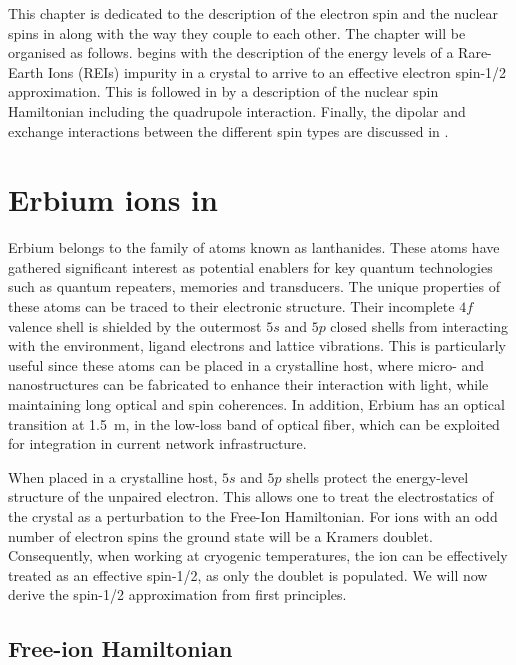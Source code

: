 This chapter is dedicated to the description of the \Er electron spin and the nuclear spins in \Ca along with the way they couple to each other. The chapter will be organised as follows.  begins with the description of the energy levels of a Rare-Earth Ions (REIs) impurity in a crystal to arrive to an effective electron spin-1/2 approximation. This is followed in  by a description of the nuclear spin Hamiltonian including the quadrupole interaction. Finally, the dipolar and exchange interactions between the different spin types are discussed in .

\section{Erbium ions in \Ca}

Erbium belongs to the family of atoms known as lanthanides. These atoms have gathered significant interest as potential enablers for key quantum technologies such as quantum repeaters, memories and transducers. The unique properties of these atoms can be traced to their electronic structure. Their incomplete $4f$ valence shell is shielded by the outermost $5s$ and $5p$ closed shells from interacting with the environment, ligand electrons and lattice vibrations. This is particularly useful since these atoms can be placed in a crystalline host, where micro- and nanostructures can be fabricated to enhance their interaction with light, while maintaining long optical and spin coherences. In addition, Erbium has an optical transition at 1.5~\textmu m, in the low-loss band of optical fiber, which can be exploited for integration in current network infrastructure.

When placed in a crystalline host, $5s$ and $5p$ shells protect the energy-level structure of the unpaired electron. This allows one to treat the electrostatics of the crystal as a perturbation to the Free-Ion Hamiltonian. For ions with an odd number of electron spins the ground state will be a Kramers doublet. Consequently, when working at cryogenic temperatures, the ion can be effectively treated as an effective spin-1/2, as only the doublet is populated. We will now derive the spin-1/2 approximation from first principles.

\subsection{Free-ion Hamiltonian}

